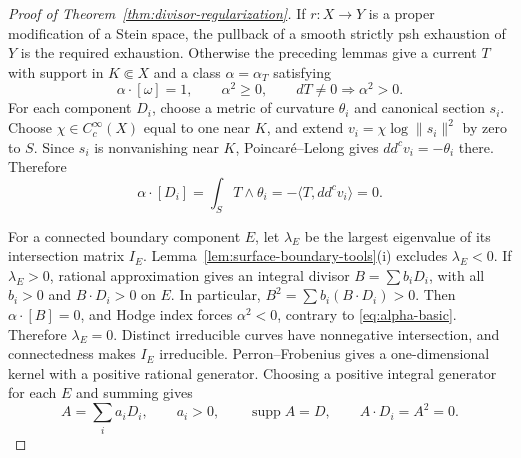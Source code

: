 \documentclass[11pt]{amsart}
\theoremstyle{definition}
\theoremstyle{remark}
\numberwithin{equation}{section}
\newcommand{\ddc}{dd^c}
\newcommand{\supp}{\operatorname{supp}}
\begin{document}
\begin{proof}[Proof of Theorem~\ref{thm:divisor-regularization}]
If $r:X\to Y$ is a proper modification of a Stein space, the
pullback of a smooth strictly psh exhaustion of $Y$ is the required
exhaustion. Otherwise the preceding lemmas give a current $T$ with
support in $K\Subset X$ and a class $\alpha=\alpha_T$ satisfying
\begin{equation}\label{eq:alpha-basic}
 \alpha\cdot[\omega]=1,\qquad \alpha^2\ge0,
 \qquad dT\ne0\Longrightarrow\alpha^2>0.
\end{equation}
For each component $D_i$, choose a metric of curvature $\theta_i$
and canonical section $s_i$. Choose $\chi\in C_c^\infty(X)$ equal
to one near $K$, and extend
$v_i=\chi\log\|s_i\|^2$ by zero to $S$.
Since $s_i$ is nonvanishing near $K$, Poincar\'e--Lelong gives
$\ddc v_i=-\theta_i$ there. Therefore
\begin{equation}\label{eq:alpha-boundary-orthogonality}
 \alpha\cdot[D_i]=\int_S T\wedge\theta_i
          =-\langle T,\ddc v_i\rangle=0.
\end{equation}

For a connected boundary component $E$, let $\lambda_E$ be the
largest eigenvalue of its intersection matrix $I_E$.
Lemma~\ref{lem:surface-boundary-tools}\textup{(i)} excludes
$\lambda_E<0$. If $\lambda_E>0$, rational approximation gives an
integral divisor $B=\sum b_iD_i$, with all $b_i>0$ and
$B\cdot D_i>0$ on $E$. In particular,
$B^2=\sum b_i(B\cdot D_i)>0$.
Then $\alpha\cdot[B]=0$, and Hodge index forces $\alpha^2<0$,
contrary to \eqref{eq:alpha-basic}. Therefore $\lambda_E=0$.
Distinct irreducible curves have nonnegative intersection, and connectedness
makes $I_E$ irreducible. Perron--Frobenius gives a one-dimensional
kernel with a positive rational generator. Choosing a positive integral
generator for each $E$ and summing gives
\begin{equation}\label{eq:full-support-null-divisor}
 A=\sum_i a_iD_i,\qquad a_i>0,\qquad
 \supp A=D,\qquad A\cdot D_i=A^2=0.
\end{equation}


\end{proof}
\end{document}
